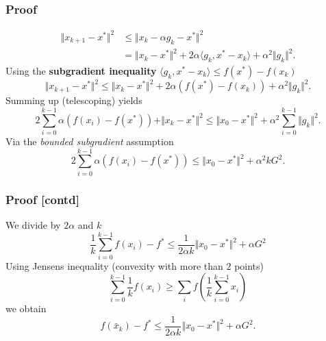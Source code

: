 \documentclass{beamer}
\begin{document}
\begin{frame}
  \frametitle{Proof}
  \vspace{-0.5cm}
  \begin{equation}
    \begin{aligned}
      \Vert x_{k+1} - x^* \Vert^2 &\le \Vert x_k - \alpha g_k - x^* \Vert^2 \\
      &= \Vert x_k-x^* \Vert^2 + 2 \alpha \langle g_k, x^*-x_k \rangle + \alpha^2 \Vert g_k \Vert^2.
    \end{aligned}
  \end{equation}
  Using the \textbf{subgradient inequality} $\langle g_k , x^* -x_k \rangle \le f(x^*) - f(x_k)$
  \begin{equation}
    \Vert x_{k+1} - x^* \Vert^2 \le \Vert x_k-x^* \Vert^2 + 2 \alpha(f(x^*) - f(x_k)) + \alpha^2 \Vert g_k \Vert^2.
  \end{equation}
  Summing up (telescoping) yields
  \begin{equation}
    \label{eq:telescoping}
    2\sum_{i=0}^{k-1}  \alpha(f(x_i) - f(x^*)) + \Vert x_{k} - x^* \Vert^2 \le \Vert x_0-x^* \Vert^2 +  \alpha^2 \sum_{i=0}^{k-1} \Vert g_k \Vert^2.
  \end{equation}
  Via the \emph{bounded subgradient} assumption
  \begin{equation}
    2\sum_{i=0}^{k-1}  \alpha(f(x_i) - f(x^*)) \le \Vert x_0-x^* \Vert^2 +  \alpha^2 k G^2.
  \end{equation}
\end{frame}

\begin{frame}
  \frametitle{Proof [contd]}
  We divide by $2\alpha$ and $k$
  \begin{equation}
    \frac{1}{k}\sum_{i=0}^{k-1}  f(x_i) - f^*  \le \frac{1}{2 \alpha k} \Vert x_0-x^* \Vert^2 +  \alpha G^2
  \end{equation}
  Using Jensens inequality (convexity with more than $2$ points)
  \begin{equation}
    \sum_{i=0}^{k-1} \frac{1}{k} f(x_i) \ge \sum_{i} f \left( \frac{1}{k}\sum_{i=0}^{k-1}x_i \right)
  \end{equation}
  we obtain
  \begin{equation}
    f(\bar{x}_k) - f^*  \le \frac{1}{2 \alpha k} \Vert x_0-x^* \Vert^2 + \alpha G^2.
  \end{equation}

\end{frame}
\end{document}
